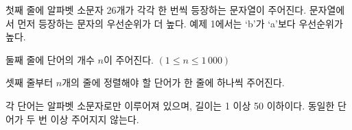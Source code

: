 첫째 줄에 알파벳 소문자 26개가 각각 한 번씩 등장하는 문자열이 주어진다.
문자열에서 먼저 등장하는 문자의 우선순위가 더 높다.
예제 1에서는 `b'가 `a'보다 우선순위가 높다.

둘째 줄에 단어의 개수 $n$이 주어진다. $(1 \le n \le 1\,000)$

셋째 줄부터 $n$개의 줄에 정렬해야 할 단어가 한 줄에 하나씩 주어진다.

각 단어는 알파벳 소문자로만 이루어져 있으며, 길이는 1 이상 50 이하이다.
동일한 단어가 두 번 이상 주어지지 않는다.
